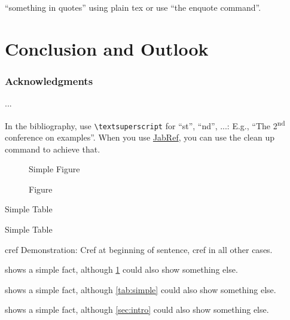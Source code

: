 \documentclass[runningheads,a4paper]{llncs}
\begin{document}
``something in quotes'' using plain tex or use \enquote{the enquote command}.

\section{Conclusion and Outlook}

\subsubsection*{Acknowledgments}
...

In the bibliography, use \texttt{\textbackslash textsuperscript} for ``st'', ``nd'', ...:
E.g., \enquote{The 2\textsuperscript{nd} conference on examples}.
When you use \href{http://www.jabref.org}{JabRef}, you can use the clean up command to achieve that.






\begin{figure}
	Simple Figure
	\caption{ Figure}
	\label{fig:simple}
\end{figure}

\begin{table}
	\caption{Simple Table}
	
	\label{tab:simple}
	Simple Table
\end{table}
cref Demonstration: Cref at beginning of sentence, cref in all other cases.

 shows a simple fact, although \cref{fig:simple} could also show something else.

 shows a simple fact, although \cref{tab:simple} could also show something else.

 shows a simple fact, although \cref{sec:intro} could also show something else.
\end{document}

